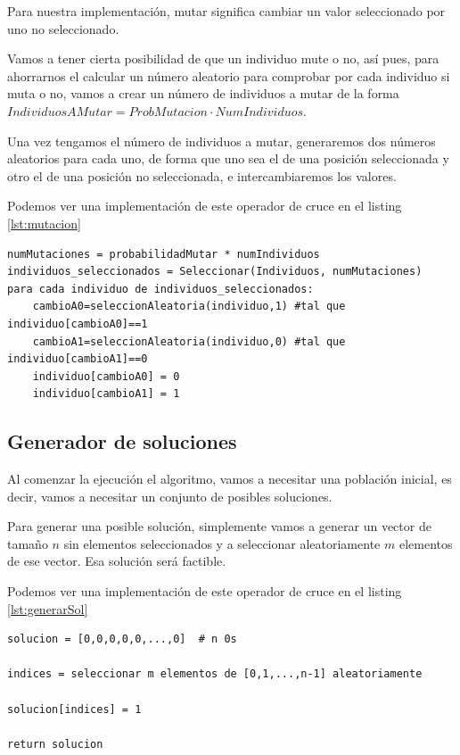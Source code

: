 Para nuestra implementación, mutar significa cambiar un valor seleccionado por uno no seleccionado.

Vamos a tener cierta posibilidad de que un individuo mute o no, así pues, para ahorrarnos el calcular un número aleatorio para comprobar por cada individuo si muta o no, vamos a crear un número de individuos a mutar de la forma $IndividuosAMutar = ProbMutacion \cdot NumIndividuos$.

Una vez tengamos el número de individuos a mutar, generaremos dos números aleatorios para cada uno, de forma que uno sea el de una posición seleccionada y otro el de una posición no seleccionada, e intercambiaremos los valores.

Podemos ver una implementación de este operador de cruce en el listing \ref{lst:mutacion}

\begin{lstlisting}[frame=single, caption={Operador de mutación}, captionpos=b, label=lst:mutacion]
numMutaciones = probabilidadMutar * numIndividuos
individuos_seleccionados = Seleccionar(Individuos, numMutaciones)
para cada individuo de individuos_seleccionados:
    cambioA0=seleccionAleatoria(individuo,1) #tal que individuo[cambioA0]==1
    cambioA1=seleccionAleatoria(individuo,0) #tal que individuo[cambioA1]==0
    individuo[cambioA0] = 0
    individuo[cambioA1] = 1 
\end{lstlisting}

\subsection{Generador de soluciones}

Al comenzar la ejecución el algoritmo, vamos a necesitar una población inicial, es decir, vamos a necesitar un conjunto de posibles soluciones.

Para generar una posible solución, simplemente vamos a generar un vector de tamaño $n$ sin elementos seleccionados y a seleccionar aleatoriamente $m$ elementos de ese vector.
Esa solución será factible.

Podemos ver una implementación de este operador de cruce en el listing \ref{lst:generarSol}

\begin{lstlisting}[frame=single, caption={Generador de soluciones}, captionpos=b, label=lst:generarSol]
solucion = [0,0,0,0,0,...,0]  # n 0s

indices = seleccionar m elementos de [0,1,...,n-1] aleatoriamente

solucion[indices] = 1

return solucion
\end{lstlisting}

